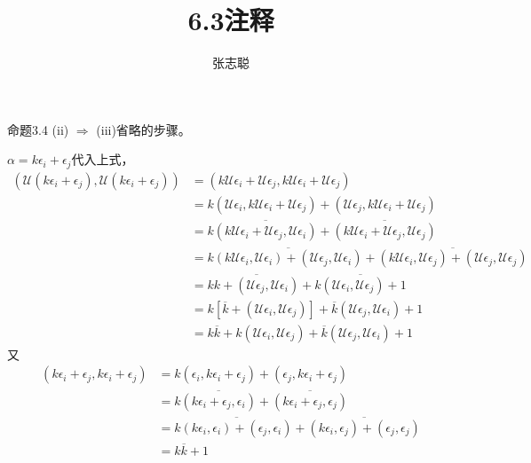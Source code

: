 \documentclass{article}
\begin{document}
\title{6.3注释}
\author{张志聪}
\maketitle

\begin{zremark}
  命题3.4 (ii) $\Rightarrow$ (iii)省略的步骤。
\end{zremark}

$\alpha = k\epsilon_i + \epsilon_j$代入上式，
\begin{align*}
  (\mathscr{U}(k\epsilon_i + \epsilon_j), \mathscr{U}(k\epsilon_i + \epsilon_j))
   & = (k\mathscr{U} \epsilon_i + \mathscr{U}\epsilon_j, k\mathscr{U} \epsilon_i + \mathscr{U}\epsilon_j)                                                                                                                               \\
   & = k (\mathscr{U} \epsilon_i, k\mathscr{U} \epsilon_i + \mathscr{U}\epsilon_j) + (\mathscr{U}\epsilon_j, k\mathscr{U} \epsilon_i + \mathscr{U}\epsilon_j)                                                                           \\
   & = k \overline{(k\mathscr{U} \epsilon_i + \mathscr{U}\epsilon_j, \mathscr{U} \epsilon_i)} + \overline{(k\mathscr{U} \epsilon_i + \mathscr{U}\epsilon_j, \mathscr{U}\epsilon_j)}                                                     \\
   & = k \overline{(k\mathscr{U} \epsilon_i,  \mathscr{U} \epsilon_i) + (\mathscr{U}\epsilon_j, \mathscr{U} \epsilon_i)} + \overline{(k\mathscr{U} \epsilon_i, \mathscr{U}\epsilon_j) + (\mathscr{U}\epsilon_j, \mathscr{U}\epsilon_j)} \\
   & = k \overline{k + (\mathscr{U}\epsilon_j, \mathscr{U} \epsilon_i)} + \overline{k(\mathscr{U} \epsilon_i, \mathscr{U}\epsilon_j) + 1}                                                                                               \\
   & = k [\overline{k} + (\mathscr{U} \epsilon_i, \mathscr{U}\epsilon_j)] + \overline{k}(\mathscr{U}\epsilon_j, \mathscr{U} \epsilon_i) + 1                                                                                             \\
   & = k \overline{k} + k(\mathscr{U} \epsilon_i, \mathscr{U}\epsilon_j) + \overline{k}(\mathscr{U}\epsilon_j, \mathscr{U} \epsilon_i) + 1
\end{align*}
又
\begin{align*}
  (k\epsilon_i + \epsilon_j, k\epsilon_i + \epsilon_j)
   & = k (\epsilon_i, k\epsilon_i + \epsilon_j) + (\epsilon_j, k \epsilon_i + \epsilon_j)                                                   \\
   & = k \overline{(k\epsilon_i + \epsilon_j, \epsilon_i)} + \overline{(k\epsilon_i + \epsilon_j, \epsilon_j)}                              \\
   & = k \overline{(k \epsilon_i, \epsilon_i) + (\epsilon_j, \epsilon_i)} + \overline{(k\epsilon_i, \epsilon_j) + (\epsilon_j, \epsilon_j)} \\
   & = k \overline{k} + 1
\end{align*}
\end{document}
